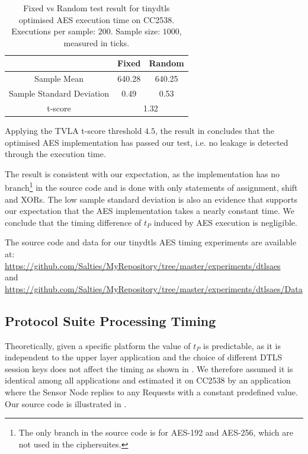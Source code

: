 \begin{table}[ht!]
	\center
	\begin{tabular}{|c|c|c|}
		\hline
		                         & Fixed       & Random      \\ \hline
		Sample Mean              & 640.28      & 640.25      \\ \hline
		Sample Standard Deviation & 0.49        & 0.53        \\ \hline
		t-score                  & \multicolumn{2}{c|}{1.32} \\ \hline
	\end{tabular}
	\caption{Fixed vs Random test result for tinydtls optimised AES execution time on CC2538. Executions per sample: $200$. Sample size: $1000$, measured in ticks.}
	\label{Tbl: Fixed vs Random test result for tinydtls AES execution time on CC2538}
\end{table}

Applying the TVLA t-score threshold $4.5$, the result in  concludes that the optimised AES implementation has passed our test, i.e. no leakage is detected through the execution time. 

The result is consistent with our expectation, as the implementation has no branch\footnote{The only branch in the source code is for AES-192 and AES-256, which are not used in the ciphersuites.} in the source code and is done with only statements of assignment, shift and XORs. The low sample standard deviation is also an evidence that supports our expectation that the AES implementation takes a nearly constant time. We conclude that the timing difference of $t_P$ induced by AES execution is negligible.

The source code and data for our tinydtls AES timing experiments are available at: \\
\url{https://github.com/Salties/MyRepository/tree/master/experiments/dtlsaes} \\
and \\
\url{https://github.com/Salties/MyRepository/tree/master/experiments/dtlsaes/Data}

\subsection{Protocol Suite Processing Timing} \label{Protocol Suite Processing Time}

Theoretically, given a specific platform the value of $t_P$ is predictable, as it is independent to the upper layer application and the choice of different DTLS session keys does not affect the timing as shown in . We therefore assumed it is identical among all applications and estimated it on CC2538 by an application where the Sensor Node replies to any Requests with a constant predefined value. Our source code is illustrated in .

